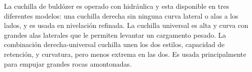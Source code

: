 La cuchilla de buldózer es operado con hidráulica y esta disponible en
tres diferentes modelos: una cuchilla derecha sin ninguna curva
lateral o alas a los lados, y es usada en nivelación refinada. La
cuchilla universal es alta y curva con grandes alas laterales que le
permiten levantar un cargamento pesado. La combinación
derecha-universal cuchilla unen los dos estilos, capacidad de
retención, y curvatura, pero menos extrema en las dos. Es usada
principalmente para empujar grandes rocas amontonadas.